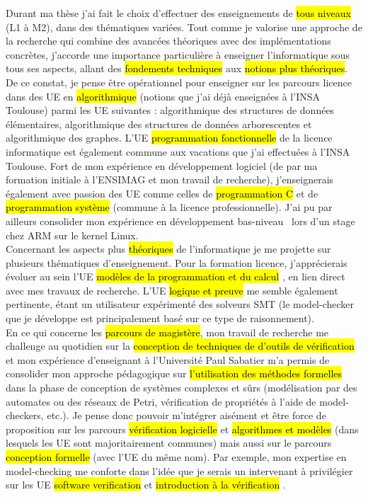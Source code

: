 \label{sec:projet_enseignement}
\vspace{10pt}

Durant ma thèse j'ai fait le choix d'effectuer des enseignements de \hl{tous
niveaux} (L1 à M2), dans des thématiques variées. Tout comme je valorise une
approche de la recherche qui combine des avancées théoriques avec des
implémentations concrètes, j'accorde une importance particulière à enseigner
l'informatique sous tous ses aspects, allant des \hl{fondements techniques} aux
\hl{notions plus théoriques}.\\

De ce constat, je pense être opérationnel pour enseigner sur les parcours
licence dans des UE en \hl{algorithmique} (notions que j'ai déjà enseignées à
l'INSA Toulouse) parmi les UE suivantes : algorithmique des structures de
données élémentaires, algorithmique des structures de données arborescentes et
algorithmique des graphes. L'UE \og \hl{programmation fonctionnelle} \fg de la
licence informatique est également commune aux vacations que j'ai
effectuées à l'INSA Toulouse. Fort de mon expérience en développement logiciel
(de par ma formation initiale à l'ENSIMAG et mon travail de recherche),
j’enseignerais également avec passion des UE comme celles de \hl{programmation
C} et de \hl{programmation système} (commune à la licence professionnelle). J'ai
pu par ailleurs consolider mon expérience en développement \og bas-niveau\ \fg
lors d'un stage chez ARM sur le kernel Linux.\\

Concernant les aspects plus \hl{théoriques} de l'informatique je me projette sur
plusieurs thématiques d'enseignement. Pour la formation licence, j’apprécierais
évoluer au sein l'UE \og \hl{modèles de la programmation et du calcul} \fg, en lien
direct avec mes travaux de recherche. L'UE \og \hl{logique et preuve} \fg me
semble également pertinente, étant un utilisateur expérimenté des solveurs SMT
(le model-checker que je développe est principalement basé sur ce type de
raisonnement).\\

En ce qui concerne les \hl{parcours de magistère}, mon travail de recherche me
challenge au quotidien sur la \hl{conception de techniques de d'outils de
vérification} et mon expérience d'enseignant à l'Université Paul Sabatier m'a
permis de consolider mon approche pédagogique sur \hl{l'utilisation des méthodes
formelles} dans la phase de conception de systèmes complexes et
sûrs (modélisation par des automates ou des réseaux de Petri, vérification de
propriétés à l'aide de model-checkers, etc.). Je pense donc pouvoir m'intégrer
aisément et être force de proposition sur les parcours \hl{vérification
logicielle} et \hl{algorithmes et modèles} (dans lesquels les UE sont
majoritairement communes) mais aussi sur le parcours \hl{conception formelle} (avec l'UE du même nom).
Par exemple, mon expertise en model-checking me conforte dans l'idée que je
serais un intervenant à privilégier sur les UE \og \hl{software verification} \fg
et \og \hl{introduction à la vérification} \fg.\\

